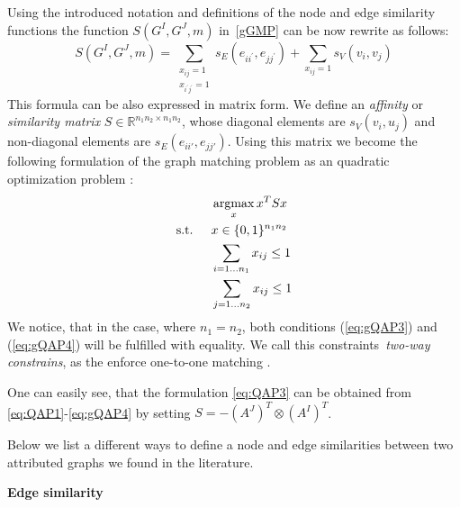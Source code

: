 Using the introduced notation and definitions of the node and edge similarity functions the function $S(G^I,G^J,m)$ in~\eqref{gGMP} can be now rewrite as follows:
\begin{equation}\label{eq:sumQAP}
	S(G^I,G^J,m)=\sum_{\substack{x_{ij}=1\\x_{i^\prime j^\prime}=1}}s_E(e_{ii^\prime},e_{jj^\prime}) + \sum_{x_{ij}=1}s_V(v_{i},v_{j})
\end{equation}
This formula can be also expressed in matrix form. We define an \emph{affinity} or \emph{similarity matrix} $S\in\mathbb{R}^{n_1n_2\times n_1n_2}$, whose diagonal elements are $s_V(v_i, u_j)$ and non-diagonal elements are $s_E(e_{ii\prime}, e_{jj\prime})$. Using this matrix we become the following formulation of the graph matching problem as an quadratic optimization problem \cite{Cho2014_Haystack, Cho2010_RRWM, Cho2012_ProgressiveGM, Conte2004,Rangarajan1996_GAGM,Leordeanu2005_SM,Leordeanu2009_IPFP}:
\begin{alignat}{2}
    &     && \argmax_x{x^TSx}                           \label{eq:gQAP1}\\ %
    & \text{s.t. } &&  x\in \{0,1\}^{n_1n_2}            \label{eq:gQAP2}\\
    &             &&  \sum_{i=1\dots n_1} x_{ij}\le 1    \label{eq:gQAP3}\\
    &             &&  \sum_{j=1\dots n_2} x_{ij}\le 1    \label{eq:gQAP4}
\end{alignat}
We notice, that in the case, where $n_1=n_2$, both conditions (\ref{eq:gQAP3}) and (\ref{eq:gQAP4}) will be fulfilled with equality. We call this constraints~\emph{two-way constrains}, as the enforce one-to-one matching .

One can easily see, that the formulation \eqref{eq:QAP3} can be obtained from \eqref{eq:QAP1}-\eqref{eq:gQAP4} by setting $S=-(A^J)^T\otimes(A^I)^T$.

Below we list a different ways to define a node and edge similarities between two attributed graphs we found in the literature.

\textbf{Edge similarity}

